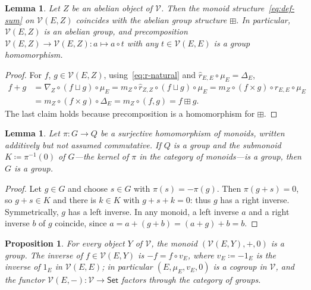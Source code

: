 \documentclass[reqno,a4paper]{amsart}
\theoremstyle{plain}
\newtheorem{lemma}[subsection]{Lemma}
\newtheorem{proposition}[subsection]{Proposition}
\theoremstyle{definition}
\newcommand{\DefEq}{\coloneq}
\newcommand{\V}{\ensuremath{\mathcal{V}}}
\newcommand{\Set}{\ensuremath{\mathsf{Set}}}
\newcommand{\cosum}{\ensuremath{\sqcup}}                   %
\newcommand{\cm}[2]{\ensuremath{\hat{r}_{#1,#2}}}          %
\newcommand{\fold}[1]{\ensuremath{\nabla_{#1}}}            %
\newcommand{\diag}[1]{\ensuremath{\Delta_{#1}}}            %
\begin{document}
\begin{lemma}\label{lem:abelian-target}
  Let \(Z\) be an abelian object of \(\V\). Then the monoid structure~\eqref{eq:def-sum} on \(\V(E,Z)\) coincides with the abelian group structure \(\boxplus\). In particular, \(\V(E,Z)\) is an abelian group, and precomposition \(\V(E,Z)\to\V(E,Z)\colon a\mapsto a\circ t\) with any \(t\in\V(E,E)\) is a group homomorphism.
\end{lemma}

\begin{proof}
  For \(f\), \(g\in\V(E,Z)\), using~\eqref{eq:r-natural} and \(\cm{E}{E}\circ\mu_{E}=\diag{E}\),
  \begin{align*}
    f+g & =\fold{Z}\circ(f\cosum g)\circ\mu_{E} =m_{Z}\circ\cm{Z}{Z}\circ(f\cosum g)\circ\mu_{E}=m_{Z}\circ(f\times g)\circ\cm{E}{E}\circ\mu_{E} \\
        & =m_{Z}\circ(f\times g)\circ\diag{E}=m_{Z}\circ(f,g)=f\boxplus g\text{.}
  \end{align*}
  The last claim holds because precomposition is a homomorphism for \(\boxplus\).
\end{proof}

\begin{lemma}\label{lem:monoid-extension}
  Let \(\pi\colon G\to Q\) be a surjective homomorphism of monoids, written additively but not assumed commutative. If \(Q\) is a group and the submonoid \(K\DefEq\pi^{-1}(0)\) of \(G\)---the kernel of \(\pi\) in the category of monoids---is a group, then \(G\) is a group.
\end{lemma}

\begin{proof}
  Let \(g\in G\) and choose \(s\in G\) with \(\pi(s)=-\pi(g)\). Then \(\pi(g+s)=0\), so \(g+s\in K\) and there is \(k\in K\) with \(g+s+k=0\): thus \(g\) has a right inverse. Symmetrically, \(g\) has a left inverse. In any monoid, a left inverse \(a\) and a right inverse \(b\) of \(g\) coincide, since \(a=a+(g+b)=(a+g)+b=b\).
\end{proof}

\begin{proposition}\label{prop:hom-group}
  For every object \(Y\) of \(\V\), the monoid \((\V(E,Y),+,0)\) is a group. The inverse of \(f\in\V(E,Y)\) is \(-f=f\circ v_{E}\), where \(v_{E}\DefEq-1_{E}\) is the inverse of \(1_{E}\) in \(\V(E,E)\); in particular \((E,\mu_{E},v_{E},0)\) is a cogroup in \(\V\), and the functor \(\V(E,-)\colon \V\to\Set\) factors through the category of groups.
\end{proposition}
\end{document}
